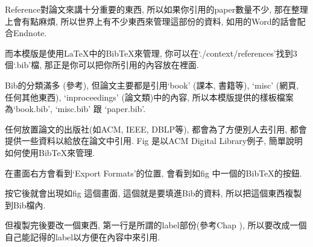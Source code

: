 

Reference對論文來講十分重要的東西, 所以如果你引用的paper數量不少, 那在整理上會有點麻煩, 所以世界上有不少東西來管理這部份的資料, 如用的Word的話會配合Endnote.

而本模版是使用LaTeX中的BibTeX來管理, 你可以在`./context/references'找到3個`.bib'檔, 那正是你可以把你所引用的內容放在裡面.

Bib的分類滿多 (參考), 但論文主要都是引用`book' (課本, 書籍等), `misc' (網頁, 任何其他東西), `inproceedings' (論文類)中的內容, 所以本模版提供的樣板檔案為`book.bib', `misc.bib' 跟 `paper.bib'.


任何放置論文的出版社(如ACM, IEEE, DBLP等), 都會為了方便別人去引用, 都會提供一些資料以給放在論文中引用. Fig  是以ACM Digital Library例子, 簡單說明如何使用BibTeX來管理.



在畫面右方會看到`Export Formats'的位置, 會看到如fig 中一個的BibTeX的按鈕.


按它後就會出現如fig 這個畫面, 這個就是要填進Bib的資料, 所以把這個東西複製到Bib檔內.


但複製完後要改一個東西, 第一行是所謂的label部份(參考Chap ), 所以要改成一個自己能記得的label以方便在內容中來引用.


\EndChapter
